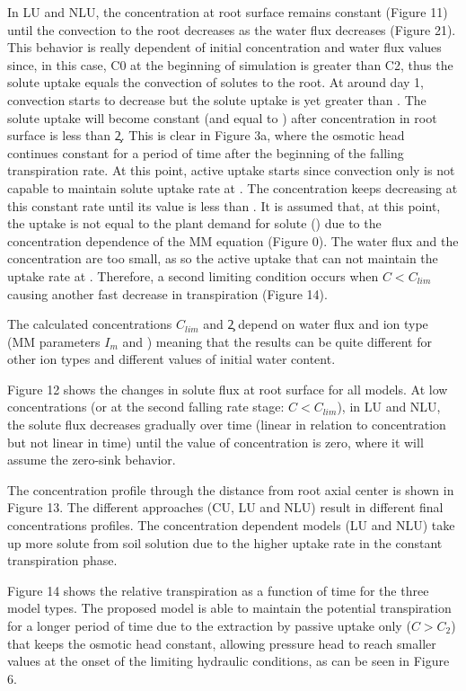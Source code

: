 In LU and NLU, the concentration at root surface remains constant (Figure 11) until the convection to the root decreases as the water flux decreases (Figure 21). This behavior is really dependent of initial concentration and water flux values since, in this case, C0 at the beginning of simulation is greater than C2, thus the solute uptake equals the convection of solutes to the root. At around day 1, convection starts to decrease but the solute uptake is yet greater than \im . The solute uptake will become constant (and equal to \im) after concentration in root surface is less than \c2. This is clear in Figure 3a, where the osmotic head continues constant for a period of time after the beginning of the falling transpiration rate. At this point, active uptake starts since convection only is not capable to maintain solute uptake rate at \im. The concentration keeps decreasing at this constant rate until its value is less than \clim. It is assumed that, at this point, the uptake is not equal to the plant demand for solute (\im) due to the concentration dependence of the MM equation (Figure 0). The water flux and the concentration are too small, as so the active uptake that can not maintain the uptake rate at \im. Therefore, a second limiting condition occurs when $C<C_{lim}$ causing another fast decrease in transpiration (Figure 14).

The calculated concentrations $C_{lim}$ and \c2 depend on water flux and ion type (MM parameters $I_m$ and \km) meaning that the results can be quite different for other ion types and different values of initial water content.

Figure 12 shows the changes in solute flux at root surface for all models. At low concentrations (or at the second falling rate stage: $C<C_{lim}$), in LU and NLU, the solute flux decreases gradually over time (linear in relation to concentration but not linear in time) until the value of concentration is zero, where it will assume the zero-sink behavior.

The concentration profile through the distance from root axial center is shown in Figure 13. The different approaches (CU, LU and NLU) result in different final concentrations profiles. The concentration dependent models (LU and NLU) take up more solute from soil solution due to the higher uptake rate in the constant transpiration phase.

Figure 14 shows the relative transpiration as a function of time for the three model types. The proposed model is able to maintain the potential transpiration for a longer period of time due to the extraction by passive uptake only ($C>C_2$) that keeps the osmotic head constant, allowing pressure head to reach smaller values at the onset of the limiting hydraulic conditions, as can be seen in Figure 6.

